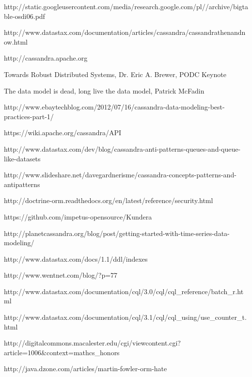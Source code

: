 \begin{thebibliography}{9}

http://static.googleusercontent.com/media/research.google.com/pl//archive/bigtable-osdi06.pdf

http://www.datastax.com/documentation/articles/cassandra/cassandrathenandnow.html

http://cassandra.apache.org

Towards Robust Distributed Systems, Dr. Eric A. Brewer, PODC Keynote

The data model is dead, long live the data model, Patrick McFadin

http://www.ebaytechblog.com/2012/07/16/cassandra-data-modeling-best-practices-part-1/

https://wiki.apache.org/cassandra/API

http://www.datastax.com/dev/blog/cassandra-anti-patterns-queues-and-queue-like-datasets

http://www.slideshare.net/davegardnerisme/cassandra-concepts-patterns-and-antipatterns

http://doctrine-orm.readthedocs.org/en/latest/reference/security.html

https://github.com/impetus-opensource/Kundera

http://planetcassandra.org/blog/post/getting-started-with-time-series-data-modeling/

http://www.datastax.com/docs/1.1/ddl/indexes

http://www.wentnet.com/blog/?p=77

http://www.datastax.com/documentation/cql/3.0/cql/cql\_reference/batch\_r.html

http://www.datastax.com/documentation/cql/3.1/cql/cql\_using/use\_counter\_t.html

http://digitalcommons.macalester.edu/cgi/viewcontent.cgi?article=1006\&context=mathcs\_honors

http://java.dzone.com/articles/martin-fowler-orm-hate


\end{thebibliography}
